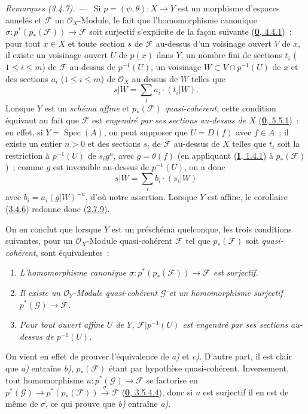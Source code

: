 \par\medskip\noindent\textit{Remarques (3.4.7). ---\ }
\label{II.3.4.7-fr}
Si $p=(\psi,\theta):X\to Y$ est un morphisme d'espaces annelés et
$\mathcal{F}$ un $\mathcal{O}_X$-Module, le fait que l'homomorphisme canonique
$\sigma:p^*(p_*(\mathcal{F}))\to\mathcal{F}$ soit surjectif s'explicite de la
façon suivante (\hyperref[0.4.4.1-fr]{\textbf{0}, 4.4.1})~: pour tout $x\in X$ et toute
section $s$ de $\mathcal{F}$ au-dessus d'un voisinage ouvert $V$ de $x$, il
existe un voisinage ouvert $U$ de $p(x)$ dans $Y$, un nombre fini de sections
$t_i$ ($1\leq i\leq m$) de $\mathcal{F}$ au-dessus de $p^{-1}(U)$, un
voisinage $W\subset V\cap p^{-1}(U)$ de $x$ et des sections $a_i$
($1\leq i\leq m$) de $\mathcal{O}_X$ au-dessus de $W$ telles que
\[
  s|W=\sum_i a_i\cdot(t_i|W).
\]
Lorsque $Y$ est un \emph{schéma affine} et $p_*(\mathcal{F})$
\emph{quasi-cohérent}, cette condition équivaut au fait que $\mathcal{F}$ est
\emph{engendré par ses sections au-dessus de $X$}
(\hyperref[0.5.5.1-fr]{\textbf{0}, 5.5.1})~: en effet, si
$Y=\operatorname{Spec}(A)$, on peut supposer que $U=D(f)$ avec $f\in A$~; il
existe un entier $n>0$ et des sections $s_i$ de $\mathcal{F}$ au-dessus de
$X$ telles que $t_i$ soit la restriction à $p^{-1}(U)$ de $s_ig^n$, avec
$g=\theta(f)$ (en appliquant (\hyperref[I.1.4.1-fr]{\textbf{I}, 1.4.1}) à
$p_*(\mathcal{F})$)~; comme $g$ est inversible au-dessus de $p^{-1}(U)$, on a
donc
\[
  s|W=\sum_i b_i\cdot(s_i|W)
\]
avec $b_i=a_i(g|W)^{-n}$, d'où notre assertion. Lorsque $Y$ est affine, le
corollaire (\hyperref[II.3.4.6-fr]{3.4.6}) redonne donc
(\hyperref[II.2.7.9-fr]{2.7.9}).

On en conclut que lorsque $Y$ est un préschéma quelconque, les trois
conditions
suivantes, pour un $\mathcal{O}_X$-Module quasi-cohérent
$\mathcal{F}$ tel que $p_*(\mathcal{F})$ soit \emph{quasi-cohérent}, sont
équivalentes~:
\begin{enumerate}
  \item[a)] \emph{L'homomorphisme canonique
    $\sigma:p^*(p_*(\mathcal{F}))\to\mathcal{F}$ est surjectif.}
  \item[b)] \emph{Il existe un $\mathcal{O}_Y$-Module quasi-cohérent
    $\mathcal{G}$ et un homomorphisme surjectif
    $p^*(\mathcal{G})\to\mathcal{F}$.}
  \item[c)] \emph{Pour tout ouvert affine $U$ de $Y$,
    $\mathcal{F}|p^{-1}(U)$ est engendré par ses sections au-dessus de
    $p^{-1}(U)$.}
\end{enumerate}
On vient en effet de prouver l'équivalence de \emph{a)} et \emph{c)}. D'autre
part, il est clair que \emph{a)} entraîne \emph{b)}, $p_*(\mathcal{F})$ étant
par hypothèse quasi-cohérent. Inversement, tout homomorphisme
$u:p^*(\mathcal{G})\to\mathcal{F}$ se factorise en
$p^*(\mathcal{G})\to p^*(p_*(\mathcal{F}))\xrightarrow{\sigma}\mathcal{F}$
(\hyperref[0.3.5.4.4-fr]{\textbf{0}, 3.5.4.4}), donc si $u$ est surjectif il en est de
même de $\sigma$, ce qui prouve que \emph{b)} entraîne \emph{a)}.

